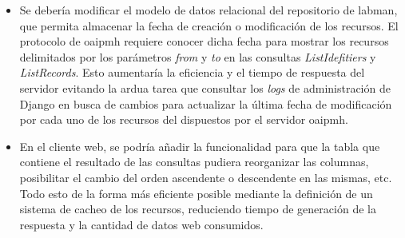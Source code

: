 \begin{itemize}
	\item Se debería modificar el modelo de datos relacional del repositorio de \acrshort{labman}, que permita almacenar la fecha de creación o modificación de los recursos. El protocolo de \acrshort{oaipmh} requiere conocer dicha fecha para mostrar los recursos delimitados por los parámetros \textit{from} y \textit{to} en las consultas \textit{ListIdefitiers} y \textit{ListRecords}. Esto aumentaría la eficiencia y el tiempo de respuesta del servidor evitando la ardua tarea que consultar los \textit{logs} de administración de Django en busca de cambios para actualizar la última fecha de modificación por cada uno de los recursos del dispuestos por el servidor \acrshort{oaipmh}.
	\item En el cliente web, se podría añadir la funcionalidad para que la tabla que contiene el resultado de las consultas pudiera reorganizar las columnas, posibilitar el cambio del orden ascendente o descendente en las mismas, etc. Todo esto de la forma más eficiente posible mediante la definición de un sistema de cacheo de los recursos, reduciendo tiempo de generación de la respuesta y la cantidad de datos web consumidos.
\end{itemize}
